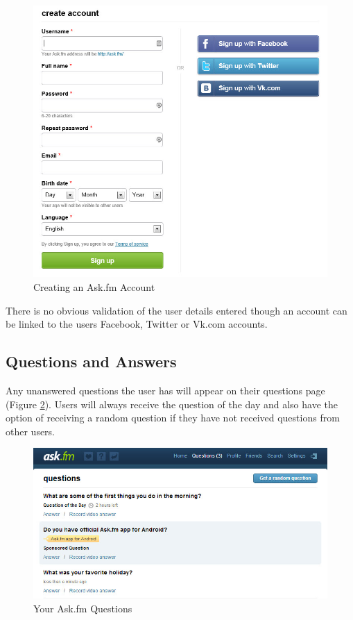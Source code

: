 \begin{figure}[h!]
	\centering
	\includegraphics[scale=0.5]{Figures/Chapter2/CreateAccount.jpg}
	\caption{Creating an Ask.fm Account}
	\label{fig:createaccount}
\end{figure}

There is no obvious validation of the user details entered though an account can be linked to the users Facebook, Twitter or Vk.com accounts.

\subsection{Questions and Answers}
Any unanswered questions the user has will appear on their questions page (Figure \ref{fig:questions}). Users will always receive the question of the day and also have the option of receiving a random question if they have not received questions from other users.

\begin{figure}[h!]
	\centering
	\includegraphics[scale=0.5]{Figures/Chapter2/Questions.jpg}
	\caption{Your Ask.fm Questions}
	\label{fig:questions}
\end{figure}


